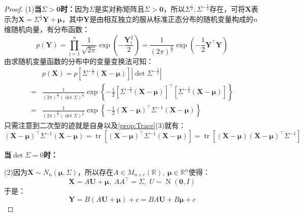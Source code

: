 \begin{proof}
	(1)\textbf{当$\Sigma>\mathbf{0}$时：}因为$\Sigma$是实对称矩阵且$\Sigma>\mathbf{0}$，所以$\Sigma^{\frac{1}{2}},\Sigma^{-\frac{1}{2}}$存在，可将$\mathbf{X}$表示为$\mathbf{X}=\Sigma^{\frac{1}{2}}\mathbf{Y}+\boldsymbol{\mu}$，其中$\mathbf{Y}$是由相互独立的服从标准正态分布的随机变量构成的$n$维随机向量，有分布函数：
	\begin{equation*}
		p(\mathbf{Y})=\prod_{i=1}^{n}\frac{1}{\sqrt{2\pi}}\exp\left(-\frac{\mathbf{Y}_i^2}{2}\right)=\frac{1}{(2\pi)^{\frac{n}{2}}}\exp\left(-\frac{1}{2}\mathbf{Y}^{\top}\mathbf{Y}\right)
	\end{equation*}
	由求随机变量函数的分布中的变量变换法可知：
	\begin{align*}
		&p(\mathbf{X})=p[\Sigma^{-\frac{1}{2}}(\mathbf{X}-\boldsymbol{\mu})]|\det\Sigma^{-\frac{1}{2}}| \\
		=&\frac{1}{(2\pi)^{\frac{n}{2}}(\det\Sigma)^\frac{1}{2}}\exp\left\{-\frac{1}{2}[\Sigma^{-\frac{1}{2}}(\mathbf{X}-\boldsymbol{\mu})]^{\top}[\Sigma^{-\frac{1}{2}}(\mathbf{X}-\boldsymbol{\mu})]\right\} \\
		=&\frac{1}{(2\pi)^{\frac{n}{2}}(\det\Sigma)^{\frac{1}{2}}}\exp\left\{-\frac{1}{2}(\mathbf{X}-\boldsymbol{\mu})^{\top}\Sigma^{-1}(\mathbf{X}-\boldsymbol{\mu})\right\}
	\end{align*}
	只需注意到二次型的迹就是自身以及\cref{prop:Trace}(3)就有：
	\begin{equation*}
		(\mathbf{X}-\boldsymbol{\mu})^{\top}\Sigma^{-1}(\mathbf{X}-\boldsymbol{\mu})=\operatorname{tr}[(\mathbf{X}-\boldsymbol{\mu})^{\top}\Sigma^{-1}(\mathbf{X}-\boldsymbol{\mu})]=\operatorname{tr}[(\mathbf{X}-\boldsymbol{\mu})(\mathbf{X}-\boldsymbol{\mu})^{\top}\Sigma^{-1}]
	\end{equation*}\par
	\textbf{当$\det\Sigma=0$时：}\par
	(2)因为$\mathbf{X}\sim N_n(\boldsymbol{\mu},\Sigma)$，所以存在$A\in M_{n\times r}(\mathbb{R}),\;\boldsymbol{\mu}\in\mathbb{R}^{n}$使得：
	\begin{equation*}
		\mathbf{X}=A\mathbf{U}+\boldsymbol{\mu},\;AA^{\top}=\Sigma,\;U\sim \operatorname{N}(\mathbf{0},I)
	\end{equation*}
	于是：
	\begin{equation*}
		\mathbf{Y}=B(A\mathbf{U}+\boldsymbol{\mu})+c=BA\mathbf{U}+B\boldsymbol{\mu}+c
	\end{equation*}

\end{proof}
